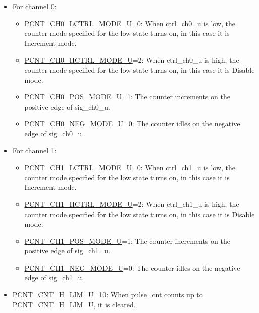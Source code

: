 \documentclass[main\_\_EN.tex]{subfiles}
\begin{document}
\begin{itemize}
    \item For channel 0:
    \begin{itemize}
        \item \hyperref[fielddesc:PCNTCH0LCTRLMODEUN]{PCNT\_CH0\_LCTRL\_MODE\_U}=0: When ctrl\_ch0\_u is low, the counter mode specified for the low state turns on, in this case it is Increment mode.
        
        \item \hyperref[fielddesc:PCNTCH0HCTRLMODEUN]{PCNT\_CH0\_HCTRL\_MODE\_U}=2: When ctrl\_ch0\_u is high, the counter mode specified for the low state turns on, in this case it is Disable mode.
        
        \item \hyperref[fielddesc:PCNTCH0POSMODEUN]{PCNT\_CH0\_POS\_MODE\_U}=1: The counter increments on the positive edge of sig\_ch0\_u.
        
        \item \hyperref[fielddesc:PCNTCH0NEGMODEUN]{PCNT\_CH0\_NEG\_MODE\_U}=0: The counter idles on the negative edge of sig\_ch0\_u.
        
    \end{itemize}
   
    \item For channel 1:
    \begin{itemize}
        \item \hyperref[fielddesc:PCNTCH1LCTRLMODEUN]{PCNT\_CH1\_LCTRL\_MODE\_U}=0: When ctrl\_ch1\_u is low, the counter mode specified for the low state turns on, in this case it is Increment mode.
        
        \item \hyperref[fielddesc:PCNTCH1HCTRLMODEUN]{PCNT\_CH1\_HCTRL\_MODE\_U}=2: When ctrl\_ch1\_u is high, the counter mode specified for the low state turns on, in this case it is Disable mode.
        
        \item \hyperref[fielddesc:PCNTCH1POSMODEUN]{PCNT\_CH1\_POS\_MODE\_U}=1: The counter increments on the positive edge of sig\_ch1\_u.
        
        \item \hyperref[fielddesc:PCNTCH1NEGMODEUN]{PCNT\_CH1\_NEG\_MODE\_U}=0: The counter idles on the negative edge of sig\_ch1\_u.
        
    \end{itemize} 
    
    \item \hyperref[fielddesc:PCNTCNTHLIMUN]{PCNT\_CNT\_H\_LIM\_U}=10: When pulse\_cnt counts up to \hyperref[fielddesc:PCNTCNTHLIMUN]{PCNT\_CNT\_H\_LIM\_U}, it is cleared.
        
\end{itemize}
\end{document}
